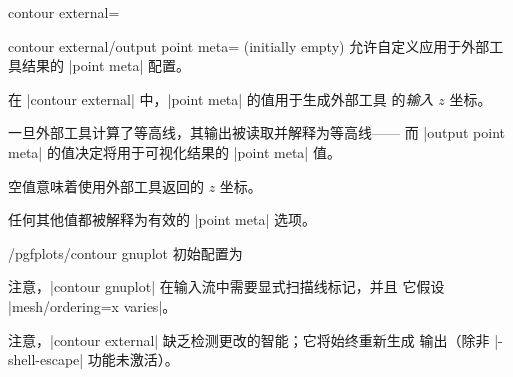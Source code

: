 {{\begin{plottype}[/pgfplots]{
    contour external=\textcolor{black}{}%
}
    \begin{pgfplotskey}{contour external/output point meta= (initially empty)}
        允许自定义应用于外部工具结果的 |point meta| 配置。

        在 |contour external| 中，|point meta| 的值用于生成外部工具
        的\emph{输入} $z$ 坐标。

        一旦外部工具计算了等高线，其输出被读取并解释为等高线——
        而 |output point meta| 的值决定将用于可视化结果的
        |point meta| 值。

        空值意味着使用外部工具返回的 $z$ 坐标。

        任何其他值都被解释为有效的 |point meta| 选项。
    \end{pgfplotskey}

    \begin{stylekey}{/pgfplots/contour gnuplot}
    \label{key:pgfplots:contour:gnuplot}
        初始配置为
\begin{codeexample}
\end{codeexample}
        注意，|contour gnuplot| 在输入流中需要显式扫描线标记，并且
        它假设 |mesh/ordering=x varies|。
    \end{stylekey}

    注意，|contour external| 缺乏检测更改的智能；它将始终重新生成
    输出（除非 |-shell-escape| 功能未激活）。
\end{plottype}

}}
